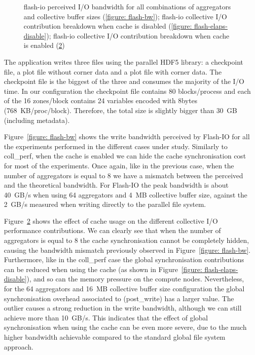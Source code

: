 \begin{figure}[!htb]
\begin{subfigure}[b]{\textwidth}
  \caption{}
  \label{figure: flash-elaps-enable}
  \end{subfigure}
  \caption{flash-io perceived I/O bandwidth for all combinations of aggregators and collective buffer sizes (\ref{figure: flash-bw}); flash-io collective I/O contribution breakdown when cache is disabled (\ref{figure: flash-elaps-disable}); flash-io collective I/O contribution breakdown when cache is enabled (\ref{figure: flash-elaps-enable})}
\end{figure}
The application writes three files using the parallel HDF5 library: a checkpoint file, a plot file without corner data and a plot file with corner data. The checkpoint file is the biggest of the three and consumes the majority of the I/O time. In our configuration the checkpoint file contains 80 blocks/process and each of the 16 zones/block contains 24 variables encoded with 8bytes (768~KB/proc/block). Therefore, the total size is slightly bigger than 30~GB (including metadata).

Figure~\ref{figure: flash-bw} shows the write bandwidth perceived by Flash-IO for all the experiments performed in the different cases under study. Similarly to coll\_perf, when the cache is enabled we can hide the cache synchronisation cost for most of the experiments. Once again, like in the previous case, when the number of aggregators is equal to 8 we have a mismatch between the perceived and the theoretical bandwidth. For Flash-IO the peak bandwidth is about 40~GB/s when using 64 aggregators and 4~MB collective buffer size, against the 2~GB/s measured when writing directly to the parallel file system.

Figure~\ref{figure: flash-elaps-enable} shows the effect of cache usage on the different collective I/O performance contributions. We can clearly see that when the number of aggregators is equal to 8 the cache synchronisation cannot be completely hidden, causing the bandwidth mismatch previously observed in Figure~\ref{figure: flash-bw}. Furthermore, like in the coll\_perf case the global synchronisation contributions can be reduced when using the cache (as shown in Figure~\ref{figure: flash-elaps-disable}), and so can the memory pressure on the compute nodes.
Nevertheless, for the 64 aggregators and 16~MB collective buffer size configuration the global synchronisation overhead associated to  (post\_write) has a larger value. The outlier causes a strong reduction in the write bandwidth, although we can still achieve more than 10~GB/s. This indicates that the effect of global synchronisation when using the cache can be even more severe, due to the much higher bandwidth achievable compared to the standard global file system approach.

